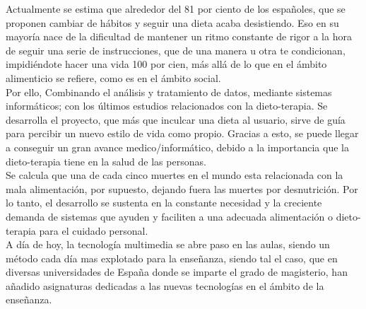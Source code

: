 
Actualmente se estima que alrededor del 81 por ciento de los españoles, que se proponen cambiar de hábitos y seguir una dieta acaba desistiendo. Eso en su mayoría nace de la dificultad de mantener un ritmo constante de rigor a la hora de seguir una serie de instrucciones, que de una manera u otra te condicionan, impidiéndote hacer una vida 100 por cien, más allá de lo que en el ámbito alimenticio se refiere, como es en el ámbito social. \\

Por ello, Combinando el análisis y tratamiento de datos, mediante sistemas informáticos; con los últimos estudios relacionados con la dieto-terapia. Se desarrolla el proyecto, que más que inculcar una dieta al usuario, sirve de guía para percibir un nuevo estilo de vida como propio. Gracias a esto, se puede llegar a conseguir un gran avance medico/informático, debido a la importancia que la dieto-terapia tiene en la salud de las personas. \\

Se calcula que una de cada cinco muertes en el mundo esta relacionada con la mala alimentación, por supuesto, dejando fuera las muertes por desnutrición. Por lo tanto, el desarrollo se sustenta en la constante necesidad y la creciente demanda de sistemas que ayuden y faciliten a una adecuada alimentación o dieto-terapia para el cuidado personal.\\

A día de hoy, la tecnología multimedia se abre paso en las aulas, siendo un método cada día mas explotado para la enseñanza, siendo tal el caso, que en diversas universidades de España donde se imparte el grado de magisterio, han añadido asignaturas dedicadas a las nuevas tecnologías en el ámbito de la enseñanza. \cite{multimedia} \\

